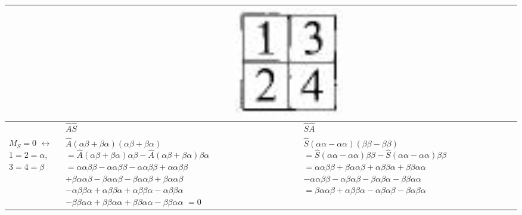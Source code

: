 \documentclass[12pt,a4paper]{article}
\begin{document}
\begin{table}[H]
\begin{tabular}{|p{2cm}|p{7cm}|p{7cm}|}
  \hline 
 & \multicolumn{2}{c|}{ \includegraphics[scale=0.2]{build/young-2hoch2-13.png} } \\
  \hline 
& $\hat{A}\hat{S}$ & $\hat{S}\hat{A}$ \\ \hline
$M_S = 0$ $\leftrightarrow$ $1=2=\alpha$, $ 3=4=\beta$ & 
\parbox[t][10em]{7cm}{
$\hat{A}\left(\alpha\beta + \beta\alpha\right)\left(\alpha\beta + \beta\alpha\right) $\\
$= \hat{A}\left(\alpha\beta + \beta\alpha\right)\alpha\beta - \hat{A}\left(\alpha\beta + \beta\alpha\right)\beta\alpha$\\
$= \alpha\alpha\beta\beta - \alpha\alpha\beta\beta - \alpha\alpha\beta\beta + \alpha\alpha\beta\beta $\\
$+ \beta\alpha\alpha\beta - \beta\alpha\alpha\beta - \beta\alpha\alpha\beta + \beta\alpha\alpha\beta$\\
$-\alpha\beta\beta\alpha + \alpha\beta\beta\alpha + \alpha\beta\beta\alpha - \alpha\beta\beta\alpha $\\$
- \beta\beta\alpha\alpha + \beta\beta\alpha\alpha + \beta\beta\alpha\alpha - \beta\beta\alpha\alpha
$\\
$= 0 $
} & 
\parbox[t][10em]{7cm}{
$\hat{S}\left(\alpha\alpha - \alpha\alpha\right)\left(\beta\beta - \beta\beta\right) $\\
$= \hat{S}\left(\alpha\alpha - \alpha\alpha\right)\beta\beta - \hat{S}\left(\alpha\alpha - \alpha\alpha\right)\beta\beta$\\
$= \alpha\alpha\beta\beta + \beta\alpha\alpha\beta + \alpha\beta\beta\alpha + \beta\beta\alpha\alpha $\\$- \alpha\alpha\beta\beta - \alpha\beta\alpha\beta - \beta\alpha\beta\alpha - \beta\beta\alpha\alpha$ \\
$= \beta\alpha\alpha\beta+ \alpha\beta\beta\alpha 
- \alpha\beta\alpha\beta- \beta\alpha\beta\alpha $
 
} \\ \hline
\end{tabular}
\end{table}
\end{document}
